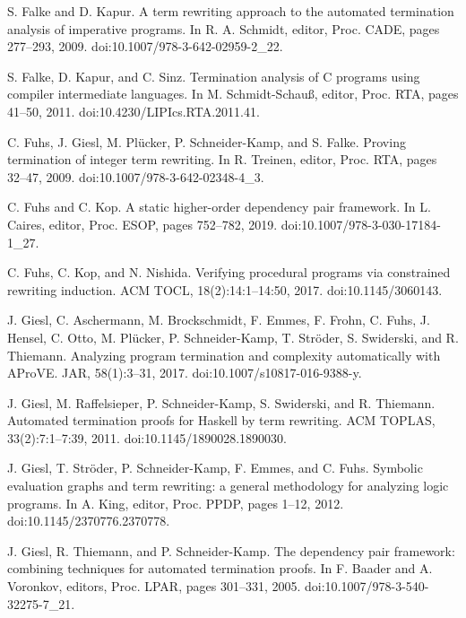 \par\noindent  [10]  S. Falke and D. Kapur.  A term rewriting approach to the automated termination analysis of imperative programs.  In R. A. Schmidt, editor, Proc. CADE, pages 277–293, 2009.  doi:10.1007/978-3-642-02959-2\_22.  
 
\par\noindent  [11]  S. Falke, D. Kapur, and C. Sinz.  Termination analysis of C programs using compiler intermediate languages.  In M. Schmidt-Schauß, editor, Proc. RTA, pages 41–50, 2011.  doi:10.4230/LIPIcs.RTA.2011.41.  
 
\par\noindent  [12]  C. Fuhs, J. Giesl, M. Plücker, P. Schneider-Kamp, and S. Falke.  Proving termination of integer term rewriting.  In R. Treinen, editor, Proc. RTA, pages 32–47, 2009.  doi:10.1007/978-3-642-02348-4\_3.  
 
\par\noindent  [13]  C. Fuhs and C. Kop.  A static higher-order dependency pair framework.  In L. Caires, editor, Proc. ESOP, pages 752–782, 2019.  doi:10.1007/978-3-030-17184-1\_27.  
 
\par\noindent  [14]  C. Fuhs, C. Kop, and N. Nishida.  Verifying procedural programs via constrained rewriting induction.  ACM TOCL, 18(2):14:1–14:50, 2017.  doi:10.1145/3060143.  
 
\par\noindent  [15]  J. Giesl, C. Aschermann, M. Brockschmidt, F. Emmes, F. Frohn, C. Fuhs, J. Hensel, C. Otto, M. Plücker, P. Schneider-Kamp, T. Ströder, S. Swiderski, and R. Thiemann.  Analyzing program termination and complexity automatically with AProVE.  JAR, 58(1):3–31, 2017.  doi:10.1007/s10817-016-9388-y.  
 
\par\noindent  [16]  J. Giesl, M. Raffelsieper, P. Schneider-Kamp, S. Swiderski, and R. Thiemann.  Automated termination proofs for Haskell by term rewriting.  ACM TOPLAS, 33(2):7:1–7:39, 2011.  doi:10.1145/1890028.1890030.  
 
\par\noindent  [17]  J. Giesl, T. Ströder, P. Schneider-Kamp, F. Emmes, and C. Fuhs.  Symbolic evaluation graphs and term rewriting: a general methodology for analyzing logic programs.  In A. King, editor, Proc. PPDP, pages 1–12, 2012.  doi:10.1145/2370776.2370778.  
 
\par\noindent  [18]  J. Giesl, R. Thiemann, and P. Schneider-Kamp.  The dependency pair framework: combining techniques for automated termination proofs.  In F. Baader and A. Voronkov, editors, Proc. LPAR, pages 301–331, 2005.  doi:10.1007/978-3-540-32275-7\_21.  
 

